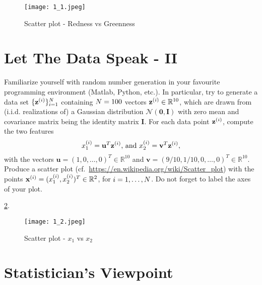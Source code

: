 \documentclass[article,11pt]{article}
\begin{document}
\vspace*{-1ex}

\begin{figure}[h!]
\begin{center}
\texttt{[image: 1\_1.jpeg]}
\end{center}
\caption{Scatter plot - Redness vs Greenness}
\label{fig:cats1}
\end{figure}


\newpage
\section{Let The Data Speak - II}
Familiarize yourself with random number generation in your favourite 
programming environment (Matlab, Python, etc.). In particular, try to generate a data set 
$\{ {\bf z}^{(i)} \}_{i=1}^{N}$ containing $N=100$ vectors ${\bf z}^{(i)} \in \mathbb{R}^{10}$, which 
are drawn from (i.i.d. realizations of) a Gaussian distribution $\mathcal{N}(\mathbf{0},\mathbf{I})$ with zero mean and covariance 
matrix being the identity matrix $\mathbf{I}$. For each data point ${\bf z}^{(i)}$, compute the two 
features 
\begin{equation}
x_{1}^{(i)} = \mathbf{u}^{T} {\bf z}^{(i)} \mbox{, and } x_{2}^{(i)}= \mathbf{v}^{T} {\bf z}^{(i)}, 
\end{equation}
with the vectors $\mathbf{u}\!=\!(1,0,\ldots,0)^{T}\in \mathbb{R}^{10}$ and $\mathbf{v}\!=\!(9/10,1/10,0,\ldots,0)^{T}\in \mathbb{R}^{10}$. 
Produce a scatter plot (cf.\ \url{https://en.wikipedia.org/wiki/Scatter_plot}) with the points 
${\bf x}^{(i)}=(x^{(i)}_{1},x^{(i)}_{2})^{T} \in \mathbb{R}^{2}$, for $i=1,\ldots,N$. 
Do not forget to label the axes of your plot. 

 \ref{fig:cats2}.

\vspace*{-1ex}

\begin{figure}[h!]
\begin{center}
\texttt{[image: 1\_2.jpeg]}
\end{center}
\caption{Scatter plot - $x_{1}$ vs $x_{2}$}
\label{fig:cats2}
\end{figure}


\newpage
\section{Statistician's Viewpoint}
\end{document}
